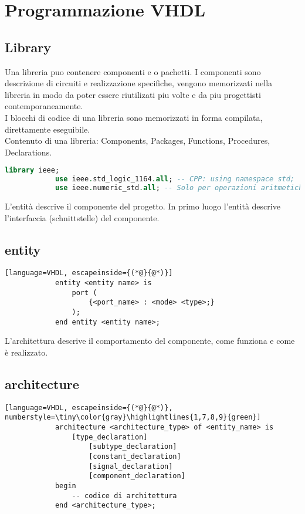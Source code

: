\section{Programmazione VHDL}
    \subsection{Library}
        Una libreria puo contenere componenti e o pachetti. I componenti sono descrizione di circuiti e realizzazione specifiche,
        vengono memorizzati nella libreria in modo da poter essere riutilizati piu volte e da piu progettisti contemporaneamente.\\
        I blocchi di codice di una libreria sono memorizzati in forma compilata, direttamente eseguibile.\\
        Contenuto di una libreria: Components, Packages, Functions, Procedures, Declarations.
        \begin{lstlisting}[language=VHDL]
            library ieee; 
            use ieee.std_logic_1164.all; -- CPP: using namespace std;
            use ieee.numeric_std.all; -- Solo per operazioni aritmetiche per vettori
        \end{lstlisting}


    L'entità descrive il componente del progetto.
    In primo luogo l'entità descrive l'interfaccia (schnittstelle) del componente.
    \subsection{entity}
        \begin{lstlisting}[language=VHDL, escapeinside={(*@}{@*)}]
            entity <entity name> is
                port (
                    {<port_name> : <mode> <type>;}
                );
            end entity <entity name>;
        \end{lstlisting}

    L'architettura descrive il comportamento del componente, come funziona e come è realizzato.
    \subsection{architecture}
        \begin{lstlisting}[language=VHDL, escapeinside={(*@}{@*)}, numberstyle=\tiny\color{gray}\highlightlines{1,7,8,9}{green}]
            architecture <architecture_type> of <entity_name> is
                [type_declaration]
                    [subtype_declaration]
                    [constant_declaration]
                    [signal_declaration]
                    [component_declaration]
            begin
                -- codice di architettura
            end <architecture_type>;
        \end{lstlisting}

